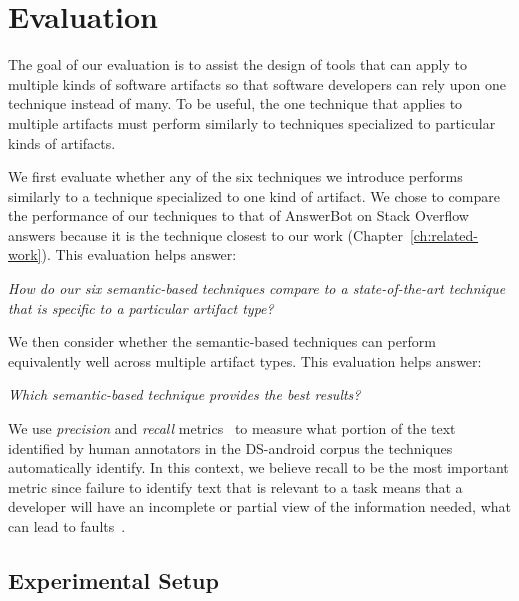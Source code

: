 \clearpage

\section{Evaluation}
\label{cp5:evaluation}



The goal of our evaluation is to assist the design of tools that
can apply to multiple kinds of software artifacts
so that software developers can rely upon
one technique instead of many. To be useful, the one technique
that applies to multiple artifacts must 
perform similarly to techniques specialized
to particular kinds of artifacts.


We first evaluate whether any of the
six techniques we introduce performs
similarly to a technique specialized to one
kind of artifact. We chose to compare
the performance of our techniques to
that of AnswerBot on Stack Overflow
answers because it is the technique closest to our work (Chapter~\ref{ch:related-work}). This
evaluation helps answer: 


\medskip
\begin{bluequote}
    \textit{How do our six semantic-based techniques compare to a state-of-the-art technique that is specific to a particular artifact type?} 
\end{bluequote}





We then consider whether the semantic-based
techniques can perform equivalently well across
multiple artifact types.
This evaluation helps answer:

\medskip
\begin{bluequote}
    \textit{Which semantic-based technique provides the best results?} 
\end{bluequote}





We use \textit{precision} and \textit{recall} metrics~\cite{manning2010IR} to measure what portion of the text identified by human annotators in the \acs{DS-android} corpus the techniques automatically identify.
In this context, we believe recall to be the most important metric since failure to identify text that is relevant to a task means that a developer will have an incomplete or partial view of the information needed,
what can lead to faults~\cite{Murphy2005}.




\subsection{Experimental Setup}

